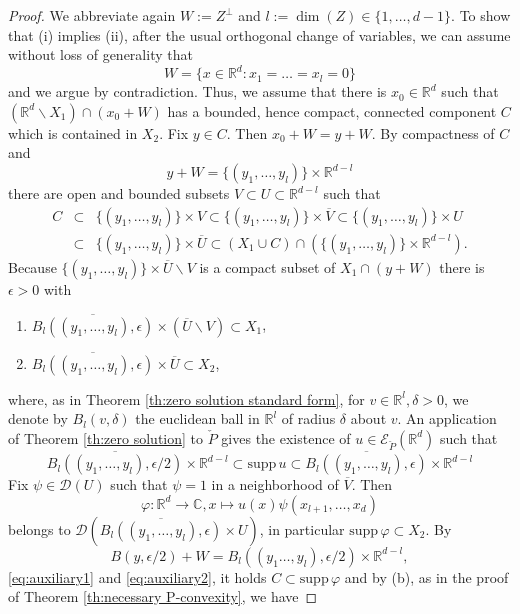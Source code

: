\documentclass[a4paper,10pt]{amsart}
\newtheorem*{crucial lemma}{Lemma \ref{lem:nice polynomial2}}
\theoremstyle{definition}
\newcommand{\R}{\mathbb{R}}
\newcommand{\C}{\mathbb{C}}
\newcommand{\supp}{\mbox{supp}\,}
\begin{document}
\begin{proof}
	We abbreviate again $W:=Z^\perp$ and $l:=\operatorname{dim}(Z)\in\{1,\ldots,d-1\}$. To show that (i) implies (ii), after the usual orthogonal change of variables, we can assume without loss of generality that
	\[W=\{x\in\R^d\colon x_1=\ldots=x_l=0\}\]
	and we argue by contradiction. Thus, we assume that there is $x_0\in\R^d$ such that $\left(\R^d\backslash X_1\right)\cap (x_0+W)$ has a bounded, hence compact, connected component $C$ which is contained in $X_2$. Fix $y\in C$. Then $x_0+W=y+W$. By compactness of $C$ and
	\[y+W=\{(y_1,\ldots,y_l)\}\times\R^{d-l}\]
	there are open and bounded subsets $V\subset U\subset\R^{d-l}$ such that
	\begin{eqnarray}\label{eq:auxiliary1}
		C&\subset& \{(y_1,\ldots,y_l)\}\times V\subset \{(y_1,\ldots,y_l)\}\times \overline{V} \subset \{(y_1,\ldots,y_l)\}\times U\\
		&\subset& \{(y_1,\ldots,y_l)\}\times \overline{U}\subset (X_1\cup C)\cap\left(\{(y_1,\ldots,y_l)\}\times\R^{d-l}\right).\nonumber
	\end{eqnarray}
	Because $\{(y_1,\ldots,y_l)\}\times \overline{U}\backslash V$ is a compact subset of $X_1\cap (y+W)$ there is $\epsilon>0$ with
	\begin{enumerate}
		\item[(a)] $\overline{B_l((y_1,\ldots,y_l),\epsilon)}\times(\overline{U}\backslash V)\subset X_1$,
		\item[(b)] $\overline{B_l((y_1,\ldots,y_l),\epsilon)}\times\overline{U}\subset X_2$,
	\end{enumerate} 
	where, as in Theorem \ref{th:zero solution standard form}, for $v\in\R^l, \delta>0$, we denote by $B_l(v,\delta)$ the euclidean ball in $\R^l$ of radius $\delta$ about $v$. An application of Theorem \ref{th:zero solution} to $\check{P}$ gives the existence of $u\in\mathscr{E}_{\check{P}}(\R^d)$ such that
	\begin{equation}\label{eq:auxiliary2}
		\overline{B_l((y_1,\ldots,y_l),\epsilon/2)}\times\R^{d-l}\subset \supp u\subset \overline{B_l((y_1,\ldots,y_l),\epsilon)}\times\R^{d-l}
	\end{equation}
	Fix $\psi\in\mathscr{D}(U)$ such that $\psi=1$ in a neighborhood of $\overline{V}$. Then
	\[\varphi\colon\R^d\rightarrow\C,x\mapsto u(x)\psi(x_{l+1},\ldots,x_d)\]
	belongs to $\mathscr{D}\left(\overline{B_l((y_1,\ldots,y_l),\epsilon)}\times U\right)$, in particular $\supp\varphi\subset X_2$. By
    \[B(y,\epsilon/2)+W=B_l((y_1\ldots,y_l),\epsilon/2)\times\R^{d-l},\]
    \eqref{eq:auxiliary1} and \eqref{eq:auxiliary2}, it holds $C\subset\supp \varphi$ and by (b), as in the proof of Theorem \ref{th:necessary P-convexity}, we have

\end{proof}
\end{document}
